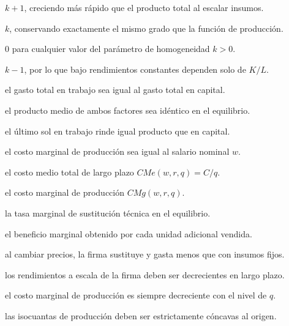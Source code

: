 \begin{opts}
    \item $k + 1$, creciendo más rápido que el producto total al escalar insumos.
    \item $k$, conservando exactamente el mismo grado que la función de producción.
    \item $0$ para cualquier valor del parámetro de homogeneidad $k > 0$.
    \item $k - 1$, por lo que bajo rendimientos constantes dependen solo de $K/L$.
\end{opts}

\begin{opts}
    \item el gasto total en trabajo sea igual al gasto total en capital.
    \item el producto medio de ambos factores sea idéntico en el equilibrio.
    \item el último sol en trabajo rinde igual producto que en capital.
    \item el costo marginal de producción sea igual al salario nominal $w$.
\end{opts}

\begin{opts}
    \item el costo medio total de largo plazo $CMe(w,r,q) = C/q$.
    \item el costo marginal de producción $CMg(w,r,q)$.
    \item la tasa marginal de sustitución técnica en el equilibrio.
    \item el beneficio marginal obtenido por cada unidad adicional vendida.
\end{opts}

\begin{opts}
    \item al cambiar precios, la firma sustituye y gasta menos que con insumos fijos.
    \item los rendimientos a escala de la firma deben ser decrecientes en largo plazo.
    \item el costo marginal de producción es siempre decreciente con el nivel de $q$.
    \item las isocuantas de producción deben ser estrictamente cóncavas al origen.
\end{opts}

